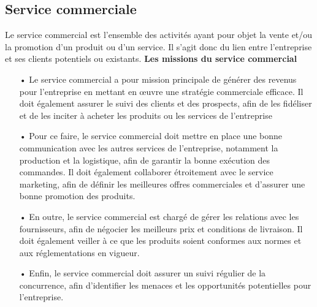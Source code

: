 \documentclass[edit,12pt,a4paper,ChapStyle,oneside,doubleinterligne]{report}
\begin{document}
\subsection{Service commerciale}
Le service commercial est l’ensemble des activités ayant pour objet la vente et/ou la promotion d’un produit ou d’un service. Il s’agit donc du lien entre l’entreprise et ses clients potentiels ou existants\cite{Service}.
\newline\textbf{Les missions du service commercial}\newline
\begin{itemize}
    \item [•]   Le service commercial a pour mission principale de générer des revenus pour l’entreprise en mettant en œuvre une stratégie commerciale efficace. Il doit également assurer le suivi des clients et des prospects, afin de les fidéliser et de les inciter à acheter les produits ou les services de l’entreprise
    \item [•]	Pour ce faire, le service commercial doit mettre en place une bonne communication avec les autres services de l’entreprise, notamment la production et la logistique, afin de garantir la bonne exécution des commandes. Il doit également collaborer étroitement avec le service marketing, afin de définir les meilleures offres commerciales et d’assurer une bonne promotion des produits.
    \item [•]   En outre, le service commercial est chargé de gérer les relations avec les fournisseurs, afin de négocier les meilleurs prix et conditions de livraison. Il doit également veiller à ce que les produits soient conformes aux normes et aux réglementations en vigueur.
    \item [•]   Enfin, le service commercial doit assurer un suivi régulier de la concurrence, afin d’identifier les menaces et les opportunités potentielles pour l’entreprise.
\end{itemize}
\end{document}
